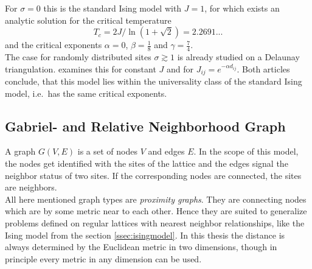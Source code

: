     For \(\sigma = 0\) this is the standard Ising model with \(J = 1\),
    for which exists an analytic solution \cite{Onsager1944} for the
    critical temperature
    \begin{equation}
        T_c = 2J/\ln(1+\sqrt 2) = 2.2691...
        \label{eq:exactTc}
    \end{equation}
    and the critical exponents \(\alpha = 0\), \(\beta = \frac{1}{8}\)
    and \(\gamma = \frac{7}{4}\).\\
    The case for randomly distributed sites \(\sigma \gtrsim 1\) is
    already studied on a Delaunay triangulation. \cite{Janke1994} examines
    this for constant \(J\) and \cite{Lima2000} for \(J_{ij} = e^{-\alpha d_{ij}}\).
    Both articles conclude, that this model lies within the universality
    class of the standard Ising model, i.e.\ has the same critical
    exponents.

\subsection{Gabriel- and Relative Neighborhood Graph}
\label{ssec:graphtypes}
    A graph \(G(V,E)\) is a set of nodes \(V\) and edges \(E\). In the
    scope of this model, the nodes get identified with the sites of the
    lattice and the edges signal the neighbor status of two sites. If the
    corresponding nodes are connected, the sites are neighbors.\\
    All here mentioned graph types are \emph{proximity graphs}. They are
    connecting nodes which are by some metric near to each other.
    Hence they are suited to generalize problems defined on regular
    lattices with nearest neighbor relationships, like the Ising model
    from the section \ref{ssec:isingmodel}.
    In this thesis the distance is always determined by the Euclidean
    metric in two dimensions, though in principle every metric in any
    dimension can be used.\\

